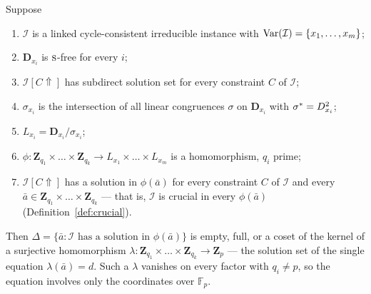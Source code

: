 \begin{longtheorem}\label{thm:codim-one}
Suppose
\begin{enumerate}\romanlabels\tightlist
\item $\mathcal I$ is a linked cycle-consistent irreducible instance with
  $\operatorname{Var}(\mathcal I)=\{x_{1},\dots,x_{m}\}$;
\item $\mathbf D_{x_{i}}$ is $\textup{\textsc{s}}$-free for every $i$;
\item $\mathcal I[C\Uparrow]$ has subdirect solution set for every constraint
  $C$ of $\mathcal I$;
\item $\sigma_{x_{i}}$ is the intersection of all linear congruences $\sigma$
  on $\mathbf D_{x_{i}}$ with $\sigma^{*}=D_{x_{i}}^{2}$;
\item $L_{x_{i}}=\mathbf D_{x_{i}}/\sigma_{x_{i}}$;
\item $\phi\colon\mathbf Z_{q_{1}}\times\dots\times\mathbf Z_{q_{k}}\to
  L_{x_{1}}\times\dots\times L_{x_{m}}$ is a homomorphism, $q_{i}$ prime;
\item $\mathcal I[C\Uparrow]$ has a solution in $\phi(\bar a)$ for every
  constraint $C$ of $\mathcal I$ and every
  $\bar a\in\mathbf Z_{q_{1}}\times\dots\times\mathbf Z_{q_{k}}$ --- that is,
  $\mathcal I$ is crucial in every $\phi(\bar a)$
  (Definition~\ref{def:crucial}).
\end{enumerate}
Then
$\Delta=\{\bar a:\mathcal I\text{ has a solution in }\phi(\bar a)\}$ is empty,
full, or a coset of the kernel of a surjective homomorphism
$\lambda\colon\mathbf Z_{q_{1}}\times\dots\times\mathbf Z_{q_{k}}\to
\mathbf Z_{p}$ --- the solution set of the single equation
$\lambda(\bar a)=d$. Such a $\lambda$ vanishes on every factor with
$q_{i}\neq p$, so the equation involves only the coordinates over
$\mathbb F_{p}$.
\end{longtheorem}

